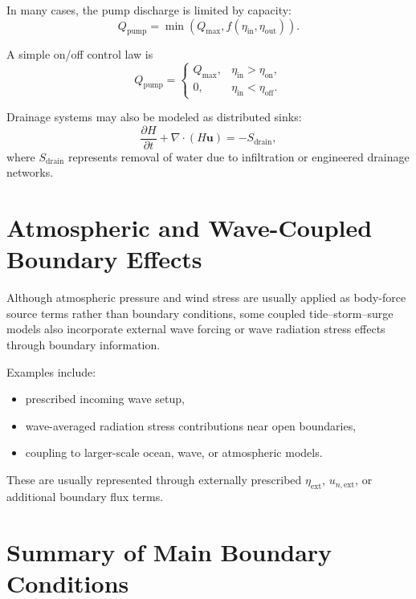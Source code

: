 \documentclass[11pt]{article}
\begin{document}
In many cases, the pump discharge is limited by capacity:
\begin{equation}
Q_{\mathrm{pump}} = \min\left(Q_{\max}, f(\eta_{\mathrm{in}}, \eta_{\mathrm{out}})\right).
\end{equation}

A simple on/off control law is
\begin{equation}
Q_{\mathrm{pump}} =
\begin{cases}
Q_{\max}, & \eta_{\mathrm{in}} > \eta_{\mathrm{on}}, \\
0, & \eta_{\mathrm{in}} < \eta_{\mathrm{off}}.
\end{cases}
\end{equation}

Drainage systems may also be modeled as distributed sinks:
\begin{equation}
\frac{\partial H}{\partial t} + \nabla\cdot(H\bm{u})
= -S_{\mathrm{drain}},
\end{equation}
where $S_{\mathrm{drain}}$ represents removal of water due to
infiltration or engineered drainage networks.

\section{Atmospheric and Wave-Coupled Boundary Effects}

Although atmospheric pressure and wind stress are usually applied as body-force source terms rather than boundary conditions, some coupled tide--storm--surge models also incorporate external wave forcing or wave radiation stress effects through boundary information.

Examples include:
\begin{itemize}[leftmargin=2em]
    \item prescribed incoming wave setup,
    \item wave-averaged radiation stress contributions near open boundaries,
    \item coupling to larger-scale ocean, wave, or atmospheric models.
\end{itemize}

These are usually represented through externally prescribed \(\eta_{\mathrm{ext}}\), \(u_{n,\mathrm{ext}}\), or additional boundary flux terms.

\section{Summary of Main Boundary Conditions}
\end{document}
